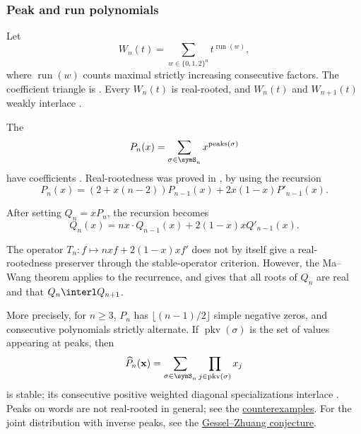 \subsubsection[peakRunPolynomialsRealRooted]{Peak and run polynomials}

\begin{example*}
Let
\[
 W_n(t)=\sum_{w\in\{0,1,2\}^n}t^{\operatorname{run}(w)},
\]
where $\operatorname{run}(w)$ counts maximal strictly increasing consecutive
factors.  The coefficient triangle is .  Every $W_n(t)$ is
real-rooted, and $W_n(t)$ and $W_{n+1}(t)$ weakly interlace
\cite[Thm.~6.1]{Alexandersson2026Eulerian}.
\end{example*}


\begin{example*}\label{ex:peakSturm}

The \label{peakGeneratingPolynomial}
\[
  P_n(x)=\sum_{\sigma\in\symS_n} x^{\text{peaks}(\sigma)}
\]
have coefficients .
Real-rootedness was proved in \cite{WarrenSeneta1996}, by using the recursion
\begin{equation}
 P_n(x) = (2+x(n-2)) P_{n-1}(x) + 2x(1-x) P'_{n-1}(x).
\end{equation}

After setting \(Q_n=xP_n\), the recursion becomes
\begin{equation}
 Q_n(x) = n x\cdot  Q_{n-1}(x) + 2(1-x)x Q'_{n-1}(x).
\end{equation}

The operator \(T_n:f \mapsto nx f + 2(1-x)x f'\) does not by itself
give a real-rootedness preserver through the stable-operator criterion.
However, the Ma--Wang theorem \cite{MaWang2008} applies to the recurrence,
and gives that all roots of \(Q_n\) are real and that
\(Q_n\interl Q_{n+1}\).

More precisely, for $n\geq3$, $P_n$ has $\lfloor(n-1)/2\rfloor$ simple
negative zeros, and consecutive polynomials strictly alternate.  If
$\operatorname{pkv}(\sigma)$ is the set of values appearing at peaks, then
\[
 \widehat P_n(\mathbf x)=
 \sum_{\sigma\in\symS_n}\prod_{j\in\operatorname{pkv}(\sigma)}x_j
\]
is stable; its consecutive positive weighted diagonal specializations
interlace \cite[Thms.~6.2--6.3]{Alexandersson2026Eulerian}.
Peaks on words are not real-rooted in general; see the
\hyperref[counterexamplesWordPeaks]{counterexamples}.  For the joint
distribution with inverse peaks, see the
\hyperref[conjInversePeaks]{Gessel--Zhuang conjecture}.
\end{example*}



